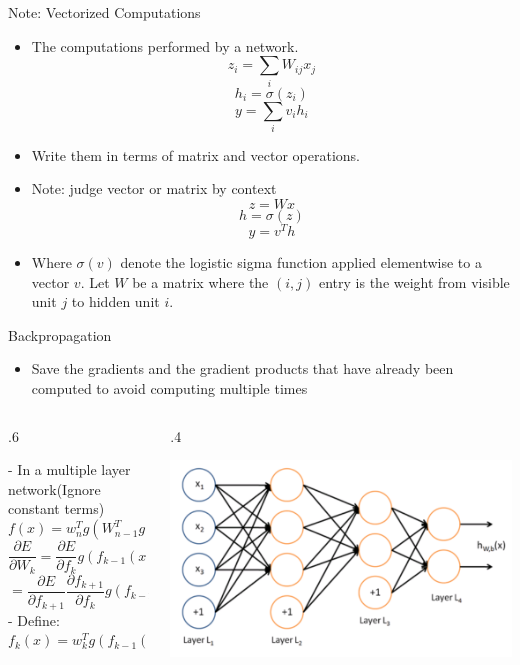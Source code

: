 \documentclass[12pt,notes,mathserif]{beamer}
\newcommand{\begincols}[1]{\begin{column}{#1}}
\newcommand{\stopcols}{\end{column}}
\providecommand{\tightlist}{%
	\setlength{\itemsep}{0pt}\setlength{\parskip}{0pt}}
\begin{document}
\begin{frame}{Note: Vectorized Computations}

\begin{itemize}
\tightlist
\item
  The computations performed by a network. \[z_i = \sum_{i} W_{ij} x_j\]
  \[h_i=\sigma(z_i)\] \[y=\sum_i v_i h_i\]
\item
  Write them in terms of matrix and vector operations.
\item
  Note: judge vector or matrix by context \[z=Wx\] \[h=\sigma(z)\]
  \[y=v^T h\]
\item
  Where \(\sigma(v)\) denote the logistic sigma function applied
  elementwise to a vector \(v\). Let \(W\) be a matrix where the
  \((i,j)\) entry is the weight from visible unit \(j\) to hidden unit
  \(i\).
\end{itemize}

\end{frame}

\begin{frame}{Backpropagation}

\begin{itemize}
\tightlist
\item
  Save the gradients and the gradient products that have already been
  computed to avoid computing multiple times
\end{itemize}

\begin{columns}
    \begincols{.6\textwidth}
    
    - In a multiple layer network(Ignore constant terms)    
    $$f(x)=w_{n}^{T}g (W_{n-1}^{T}g(W_{n-2}^{T}g\ (W_{1}^{T}g(x)))))$$
    $$
    \frac{\partial E}{\partial W_{k}}=\frac{\partial E}{\partial f_{k}}g(f_{k-1}(x))
    $$
    $$
    =\frac{\partial E}{\partial f_{k+1}}\frac{\partial f_{k+1}}{\partial f_{k}}g(f_{k-1}(x))
    $$
    - Define: $f_{k}(x)=w_{k}^{T}g(f_{k-1}(x)),  f_{0}(x)=x$
    \stopcols
    \begincols{.4\textwidth}
    \begin{center}
        \includegraphics[width=\textwidth]{2018-04-15-13-09-15.png}
    \end{center}
    \stopcols
\end{columns}

\end{frame}
\end{document}
